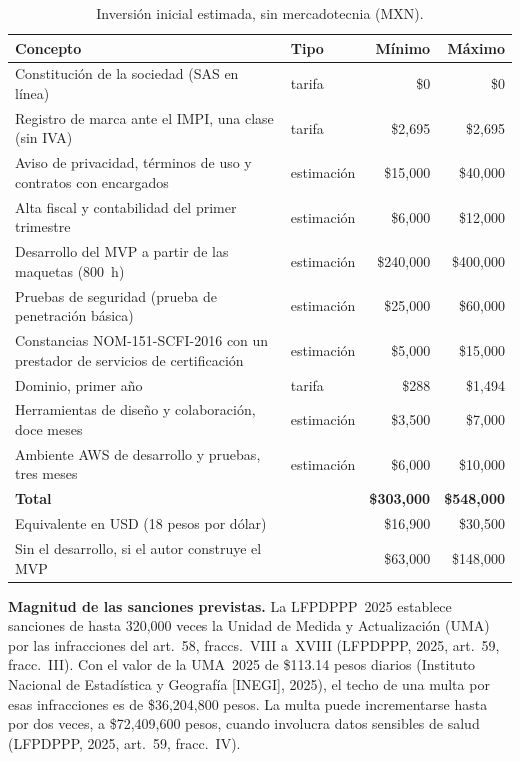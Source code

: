\documentclass[12pt, a4paper]{article}
\begin{document}
\begin{table}[!htbp]
  \centering
  \caption{Inversión inicial estimada, sin mercadotecnia (MXN).}
  \label{tab:inversion}
  \footnotesize
  \begin{tabularx}{\textwidth}{X l r r}
    \toprule
    \textbf{Concepto} & \textbf{Tipo} & \textbf{Mínimo} & \textbf{Máximo} \\
    \midrule
    Constitución de la sociedad (SAS en línea) & tarifa & \$0 & \$0 \\
    Registro de marca ante el IMPI, una clase (sin IVA) & tarifa & \$2,695 & \$2,695 \\
    Aviso de privacidad, términos de uso y contratos con encargados & estimación & \$15,000 & \$40,000 \\
    Alta fiscal y contabilidad del primer trimestre & estimación & \$6,000 & \$12,000 \\
    Desarrollo del MVP a partir de las maquetas (800~h) & estimación & \$240,000 & \$400,000 \\
    Pruebas de seguridad (prueba de penetración básica) & estimación & \$25,000 & \$60,000 \\
    Constancias NOM-151-SCFI-2016 con un prestador de servicios de certificación & estimación & \$5,000 & \$15,000 \\
    Dominio, primer año & tarifa & \$288 & \$1,494 \\
    Herramientas de diseño y colaboración, doce meses & estimación & \$3,500 & \$7,000 \\
    Ambiente AWS de desarrollo y pruebas, tres meses & estimación & \$6,000 & \$10,000 \\
    \midrule
    \textbf{Total} & & \textbf{\$303,000} & \textbf{\$548,000} \\
    Equivalente en USD (18 pesos por dólar) & & \$16,900 & \$30,500 \\
    Sin el desarrollo, si el autor construye el MVP & & \$63,000 & \$148,000 \\
    \bottomrule
  \end{tabularx}
\end{table}
 
\textbf{Magnitud de las sanciones previstas.} La LFPDPPP~2025 establece
sanciones de hasta 320,000 veces la Unidad de Medida y Actualización
(UMA) por las infracciones del art.~58, fraccs.~VIII a~XVIII (LFPDPPP,
2025, art.~59, fracc.~III). Con el valor de la UMA~2025 de \$113.14
pesos diarios (Instituto Nacional de Estadística y Geografía [INEGI],
2025), el techo de una multa por esas infracciones es de \$36,204,800
pesos. La multa puede incrementarse hasta por dos veces, a \$72,409,600
pesos, cuando involucra datos sensibles de salud (LFPDPPP, 2025,
art.~59, fracc.~IV).
\end{document}
